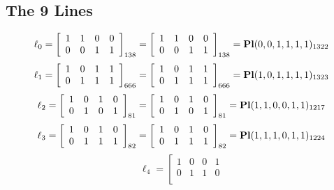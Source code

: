 \documentclass{article}
\begin{document}
{\subsection*{The 9 Lines}
$$
\ell_{0} = 
\left[
\begin{array}{*{4}{r}}
1 & 1 & 0 & 0\\
0 & 0 & 1 & 1\\
\end{array}
\right]
_{138}
=
\left[
\begin{array}{*{4}c}
1  & 1  & 0  & 0\\
0  & 0  & 1  & 1\\
\end{array}
\right]_{138}
={\rm\bf Pl}(0,0,1,1,1,1 )_{1322}$$
$$
\ell_{1} = 
\left[
\begin{array}{*{4}{r}}
1 & 0 & 1 & 1\\
0 & 1 & 1 & 1\\
\end{array}
\right]
_{666}
=
\left[
\begin{array}{*{4}c}
1  & 0  & 1  & 1\\
0  & 1  & 1  & 1\\
\end{array}
\right]_{666}
={\rm\bf Pl}(1,0,1,1,1,1 )_{1323}$$
$$
\ell_{2} = 
\left[
\begin{array}{*{4}{r}}
1 & 0 & 1 & 0\\
0 & 1 & 0 & 1\\
\end{array}
\right]
_{81}
=
\left[
\begin{array}{*{4}c}
1  & 0  & 1  & 0\\
0  & 1  & 0  & 1\\
\end{array}
\right]_{81}
={\rm\bf Pl}(1,1,0,0,1,1 )_{1217}$$
$$
\ell_{3} = 
\left[
\begin{array}{*{4}{r}}
1 & 0 & 1 & 0\\
0 & 1 & 1 & 1\\
\end{array}
\right]
_{82}
=
\left[
\begin{array}{*{4}c}
1  & 0  & 1  & 0\\
0  & 1  & 1  & 1\\
\end{array}
\right]_{82}
={\rm\bf Pl}(1,1,1,0,1,1 )_{1224}$$
$$
\ell_{4} = 
\left[
\begin{array}{*{4}{r}}
1 & 0 & 0 & 1\\
0 & 1 & 1 & 0\\
\end{array}
$$}
\end{document}
